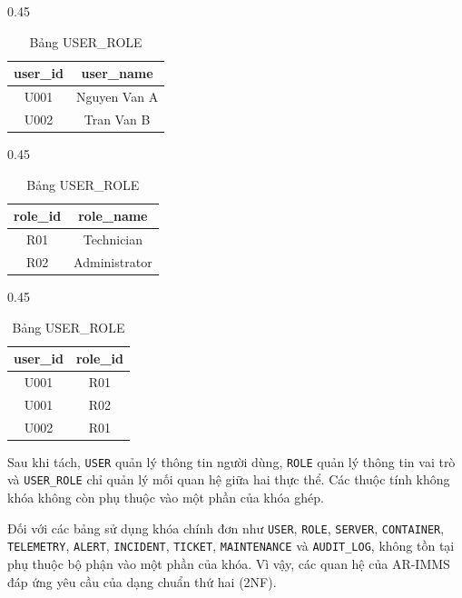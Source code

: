 \begin{table}[H]
\centering
\caption{Phân tách bảng để đạt dạng chuẩn 2NF}
\begin{subtable}[t]{0.45\textwidth}
\centering
\caption{Bảng USER}
\begin{tabular}{|c|c|}
\hline
\textbf{user\_id} & \textbf{user\_name} \\ \hline
U001 & Nguyen Van A \\ \hline
U002 & Tran Van B \\ \hline
\end{tabular}
\end{subtable}
\hfill
\begin{subtable}[t]{0.45\textwidth}
\centering
\caption{Bảng ROLE}
\begin{tabular}{|c|c|}
\hline
\textbf{role\_id} & \textbf{role\_name} \\ \hline
R01 & Technician \\ \hline
R02 & Administrator \\ \hline
\end{tabular}
\end{subtable}

\vspace{0.3cm}

\begin{subtable}[t]{0.45\textwidth}
\centering
\caption{Bảng USER\_ROLE}
\begin{tabular}{|c|c|}
\hline
\textbf{user\_id} & \textbf{role\_id} \\ \hline
U001 & R01 \\ \hline
U001 & R02 \\ \hline
U002 & R01 \\ \hline
\end{tabular}
\end{subtable}
\end{table}

Sau khi tách, \texttt{USER} quản lý thông tin người dùng, \texttt{ROLE} quản lý thông tin vai trò và \texttt{USER\_ROLE} chỉ quản lý mối quan hệ giữa hai thực thể. Các thuộc tính không khóa không còn phụ thuộc vào một phần của khóa ghép.

Đối với các bảng sử dụng khóa chính đơn như \texttt{USER}, \texttt{ROLE}, \texttt{SERVER}, \texttt{CONTAINER}, \texttt{TELEMETRY}, \texttt{ALERT}, \texttt{INCIDENT}, \texttt{TICKET}, \texttt{MAINTENANCE} và \texttt{AUDIT\_LOG}, không tồn tại phụ thuộc bộ phận vào một phần của khóa. Vì vậy, các quan hệ của AR-IMMS đáp ứng yêu cầu của dạng chuẩn thứ hai (2NF).


